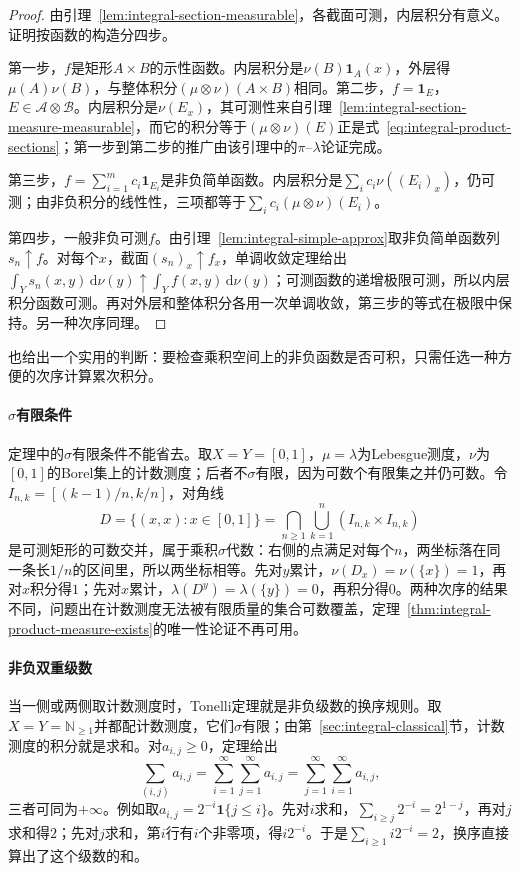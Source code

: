 \begin{proof}
由引理~\ref{lem:integral-section-measurable}，各截面可测，内层积分有意义。证明按函数的构造分四步。

第一步，$f$是矩形$A\times B$的示性函数。内层积分是$\nu(B)\mathbf 1_A(x)$，外层得$\mu(A)\nu(B)$，与整体积分$(\mu\otimes\nu)(A\times B)$相同。第二步，$f=\mathbf 1_E$，$E\in\mathcal A\otimes\mathcal B$。内层积分是$\nu(E_x)$，其可测性来自引理~\ref{lem:integral-section-measure-measurable}，而它的积分等于$(\mu\otimes\nu)(E)$正是式~\eqref{eq:integral-product-sections}；第一步到第二步的推广由该引理中的$\pi$--$\lambda$论证完成。

第三步，$f=\sum_{i=1}^mc_i\mathbf 1_{E_i}$是非负简单函数。内层积分是$\sum_ic_i\nu((E_i)_x)$，仍可测；由非负积分的线性性，三项都等于$\sum_ic_i(\mu\otimes\nu)(E_i)$。

第四步，一般非负可测$f$。由引理~\ref{lem:integral-simple-approx}取非负简单函数列$s_n\uparrow f$。对每个$x$，截面$(s_n)_x\uparrow f_x$，单调收敛定理给出$\int_Ys_n(x,y)\,\mathrm d\nu(y)\uparrow\int_Yf(x,y)\,\mathrm d\nu(y)$；可测函数的递增极限可测，所以内层积分函数可测。再对外层和整体积分各用一次单调收敛，第三步的等式在极限中保持。另一种次序同理。
\end{proof}

也给出一个实用的判断：要检查乘积空间上的非负函数是否可积，只需任选一种方便的次序计算累次积分。

\paragraph{$\sigma$有限条件}
定理中的$\sigma$有限条件不能省去。取$X=Y=[0,1]$，$\mu=\lambda$为Lebesgue测度，$\nu$为$[0,1]$的Borel集上的计数测度；后者不$\sigma$有限，因为可数个有限集之并仍可数。令$I_{n,k}=[(k-1)/n,k/n]$，对角线
\[
 D=\{(x,x):x\in[0,1]\}=\bigcap_{n\ge1}\bigcup_{k=1}^n(I_{n,k}\times I_{n,k})
\]
是可测矩形的可数交并，属于乘积$\sigma$代数：右侧的点满足对每个$n$，两坐标落在同一条长$1/n$的区间里，所以两坐标相等。先对$y$累计，$\nu(D_x)=\nu(\{x\})=1$，再对$x$积分得$1$；先对$x$累计，$\lambda(D^y)=\lambda(\{y\})=0$，再积分得$0$。两种次序的结果不同，问题出在计数测度无法被有限质量的集合可数覆盖，定理~\ref{thm:integral-product-measure-exists}的唯一性论证不再可用。

\paragraph{非负双重级数}
当一侧或两侧取计数测度时，Tonelli定理就是非负级数的换序规则。取$X=Y=\mathbb N_{\ge1}$并都配计数测度，它们$\sigma$有限；由第~\ref{sec:integral-classical}节，计数测度的积分就是求和。对$a_{i,j}\ge0$，定理给出
\[
 \sum_{(i,j)}a_{i,j}=\sum_{i=1}^\infty\sum_{j=1}^\infty a_{i,j}=\sum_{j=1}^\infty\sum_{i=1}^\infty a_{i,j},
\]
三者可同为$+\infty$。例如取$a_{i,j}=2^{-i}\mathbf 1\{j\le i\}$。先对$i$求和，$\sum_{i\ge j}2^{-i}=2^{1-j}$，再对$j$求和得$2$；先对$j$求和，第$i$行有$i$个非零项，得$i2^{-i}$。于是$\sum_{i\ge1}i2^{-i}=2$，换序直接算出了这个级数的和。

